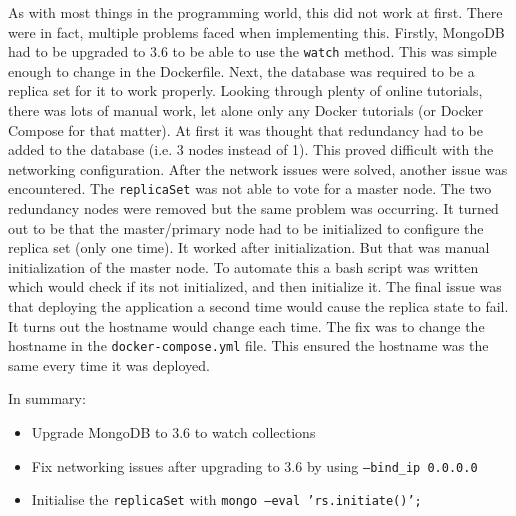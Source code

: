 As with most things in the programming world, this did not work at first. There were in fact, multiple problems faced when implementing this. Firstly, MongoDB had to be upgraded to 3.6 to be able to use the \texttt{watch} method. This was simple enough to change in the Dockerfile. Next, the database was required to be a replica set for it to work properly. Looking through plenty of online tutorials, there was lots of manual work, let alone only any Docker tutorials (or Docker Compose for that matter). At first it was thought that redundancy had to be added to the database (i.e. 3 nodes instead of 1). This proved difficult with the networking configuration. After the network issues were solved, another issue was encountered. The \texttt{replicaSet} was not able to vote for a master node. The two redundancy nodes were removed but the same problem was occurring. It turned out to be that the master/primary node had to be initialized to configure the replica set (only one time). It worked after initialization. But that was manual initialization of the master node. To automate this a bash script was written which would check if its not initialized, and then initialize it. The final issue was that deploying the application a second time would cause the replica state to fail. It turns out the hostname would change each time. The fix was to change the hostname in the \texttt{docker-compose.yml} file. This ensured the hostname was the same every time it was deployed.

In summary:

\begin{itemize}
\item Upgrade MongoDB to 3.6 to watch collections\cite{MongoDBChangeStreams}
\item Fix networking issues after upgrading to 3.6 by using \texttt{--bind\_ip 0.0.0.0}
\item Initialise the \texttt{replicaSet} with \texttt{mongo --eval 'rs.initiate()';}
\end{itemize}

